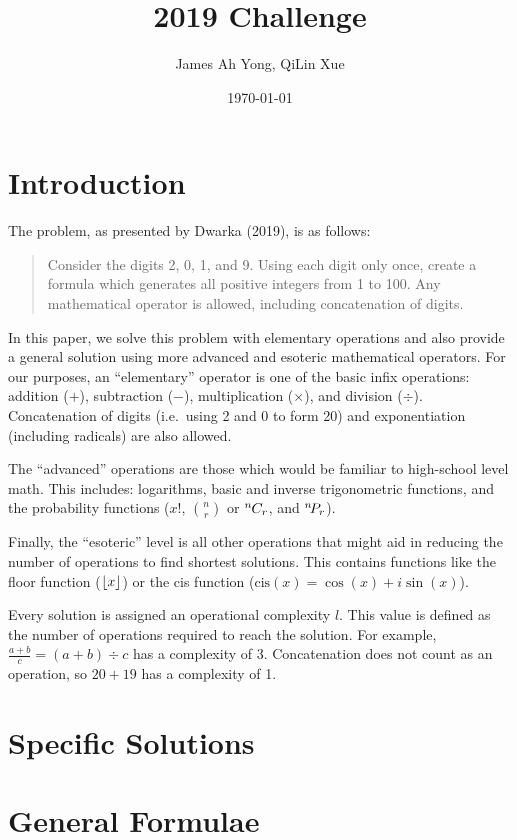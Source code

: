 \documentclass{article}
\title{2019 Challenge}
\author{James Ah Yong, QiLin Xue}
\date\today
\DeclarePairedDelimiter\floor{\lfloor}{\rfloor}
\newcommand*{\permcomb}[4][0mu]{{{}^{#3}\mkern#1#2_{#4}}}
\newcommand*{\perm}[1][-3mu]{\permcomb[#1]{P}}
\newcommand*{\comb}[1][-1mu]{\permcomb[#1]{C}}
\begin{document}
\maketitle

\section{Introduction}

The problem, as presented by Dwarka (2019), is as follows:

\begin{quotation}
  Consider the digits 2, 0, 1, and 9.
  Using each digit only once, create a formula which generates all positive integers from 1 to 100.
  Any mathematical operator is allowed, including concatenation of digits.
\end{quotation}

In this paper, we solve this problem with elementary operations and also provide a general solution using more advanced and esoteric mathematical operators.
For our purposes, an ``elementary'' operator is one of the basic infix operations: addition ($+$), subtraction ($-$), multiplication ($\times$), and division ($\div$).
Concatenation of digits (i.e.\ using 2 and 0 to form 20) and exponentiation (including radicals) are also allowed.

The ``advanced'' operations are those which would be familiar to high-school level math.
This includes: logarithms, basic and inverse trigonometric functions, and the probability functions ($x!$, $\binom{n}{r}$ or $\comb{n}{r}$, and $\perm{n}{r}$).

Finally, the ``esoteric'' level is all other operations that might aid in reducing the number of operations to find shortest solutions.
This contains functions like the floor function ($\floor{x}$) or the cis function ($\mathrm{cis}(x) = \cos(x) + i \sin(x)$).

Every solution is assigned an operational complexity $l$.
This value is defined as the number of operations required to reach the solution.
For example, $\frac{a+b}{c}=(a+b)\div c$ has a complexity of 3.
Concatenation does not count as an operation, so $20+19$ has a complexity of 1.

\section{Specific Solutions}



\section{General Formulae}


\end{document}
